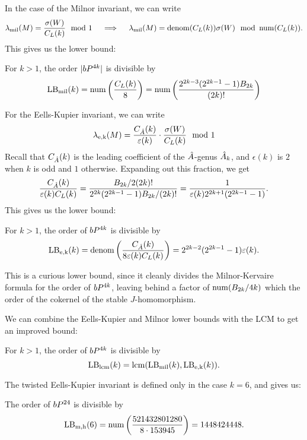 In the case of the Milnor invariant, we can write
\[
	\lambda_{\mathrm{mil}}(M) = \frac{\sigma(W)}{C_L(k)} \mod 1\quad\implies\quad \lambda_{\mathrm{mil}}(M) = \operatorname{denom}(C_L(k)) \sigma(W)\mod {\operatorname{num}}(C_L(k)).
\]
This gives us the lower bound:

\begin{proposition}\label{prop:milnor-lower-bound}
	For $k>1$, the order $|bP^{4k}|$ is divisible by
	\[
		\mathrm{LB}_{\mathrm{mil}}(k) =\operatorname{num}\left(\frac{C_L(k)}{8}\right) = \operatorname{num}\left(\frac{2^{2k-3}(2^{2k-1}-1)B_{2k}}{(2k)!}\right)
	\]
\end{proposition}

For the Eells-Kupier invariant, we can write
\[
	\lambda_{\mathrm{e,k}}(M) = \frac{C_{\hat{A}}(k)}{\varepsilon(k)}\cdot \frac{\sigma(W)}{C_L(k)} \mod 1
\]
Recall that $C_{\hat{A}}(k)$ is the leading coefficient of the ${\hat{A}}$-genus ${\hat{A}}_k$, and $\epsilon(k)$ is $2$ when $k$ is odd and $1$ otherwise. Expanding out this fraction, we get
\[
	\frac{C_{\hat{A}}(k)}{\varepsilon(k)C_L(k)} = \frac{B_{2k}/2(2k)!}{2^{2k}(2^{2k-1}-1)B_{2k}/(2k)!} = \frac{1}{\varepsilon(k) 2^{2k+1}(2^{2k-1}-1)}.
\]
This gives us the lower bound:
\begin{proposition}\label{prop:eells-kupier-lower-bound}
	For $k>1$, the order of $bP^{4k}$ is divisible by
	\[
		\mathrm{LB}_{\mathrm{e,k}}(k)=\operatorname{denom}\left(\frac{C_{\hat{A}}(k)}{8\varepsilon(k)C_L(k)}\right) = 2^{2k-2}(2^{2k-1}-1)\varepsilon(k).
	\]
\end{proposition}
This is a curious lower bound, since it cleanly divides the Milnor-Kervaire formula for the order of $bP^{4k}$, leaving behind a factor of $\operatorname{num}(B_{2k}/4k)$ which the order of the cokernel of the stable $J$-homomorphism.

We can combine the Eells-Kupier and Milnor lower bounds with the LCM to get an improved bound:

\begin{proposition}\label{prop:lcm-lower-bound}
	For $k>1$, the order of $bP^{4k}$ is divisible by \[\mathrm{LB}_{\mathrm{lcm}}(k)=\operatorname{lcm}(\mathrm{LB}_{\mathrm{mil}}(k),\mathrm{LB}_{\mathrm{e,k}}(k)).\]
\end{proposition}

The twisted Eells-Kupier invariant is defined only in the case $k=6$, and gives us:
\begin{proposition}\label{prop:twisted-eells-kupier-lower-bound}
	The order of $bP^{24}$ is divisible by
	\[
		\mathrm{LB}_{\mathrm{m,h}}(6) = \operatorname{num}\left(\frac{521432801280}{8\cdot 153945}\right) = 1448424448.
	\]
\end{proposition}

